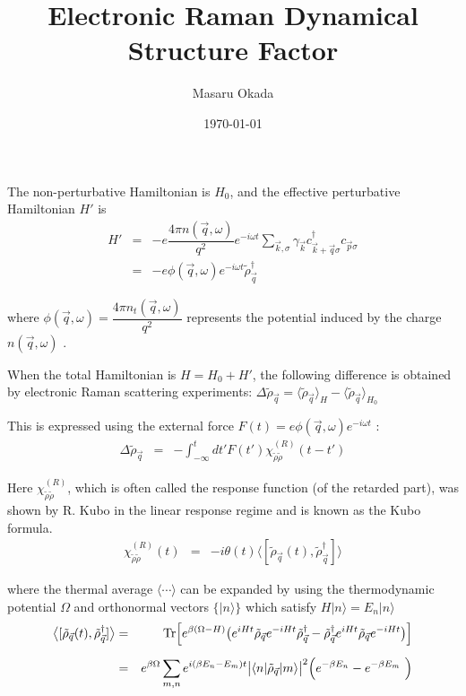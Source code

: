 \documentclass[uplatex,a4j,12pt,dvipdfmx]{jsarticle}
\title{
Electronic Raman Dynamical Structure Factor
}
\author{Masaru Okada}
\date{\today}
\begin{document}
\maketitle

\thispagestyle{empty}
The non-perturbative Hamiltonian is $H_{0}$,
and the effective perturbative Hamiltonian $H'$ is
\begin{eqnarray}
	H'
	&=&
	-e \dfrac{ 4 \pi n ( \vec{q} , \omega ) }{ q^{2} }
	e^{- i \omega t}
	\sum_{\vec{k},\sigma}
	\gamma_{\vec{k}}
	c^{\dagger}_{\vec{k}+\vec{q} \sigma} c_{\vec{p} \sigma}
	\nonumber \\ &=&
	- e \phi(\vec{q},\omega) e^{- i \omega t} \tilde{\rho}^{\dagger}_{\vec{q}}
\end{eqnarray}

where
$\phi(\vec{q},\omega) = \dfrac{ 4 \pi n_{t} ( \vec{q} , \omega ) }{ q^{2} }$
represents the potential induced by the charge
$n ( \vec{q} , \omega )$
.

When the total Hamiltonian is $H=H_{0}+H'$,
the following difference is obtained by electronic Raman scattering experiments:
$\Delta \tilde{\rho}_{\vec{q}} = \langle \tilde{\rho}_{\vec{q}} \rangle_{H} - \langle \tilde{\rho}_{\vec{q}} \rangle_{H_{0}}$


This is expressed using the external force
$F(t) = e \phi(\vec{q},\omega) e^{- i \omega t}$
:
\begin{eqnarray}
	\Delta \tilde{\rho}_{\vec{q}}
	&=&
	- \int^{t}_{-\infty} dt' F(t') \chi^{(R)}_{\tilde{\rho} \tilde{\rho}}(t - t')
\end{eqnarray}


Here
$\chi^{(R)}_{\tilde{\rho} \tilde{\rho}}$,
which is often called the response function (of the retarded part),
was shown by R. Kubo in the linear response regime and is known as the Kubo formula.
\begin{eqnarray}
	\chi^{(R)}_{\tilde{\rho} \tilde{\rho}}(t)
	&=&
	- i \theta(t) \big\langle [ \tilde{\rho}_{\vec{q}}(t) , \tilde{\rho}_{\vec{q}}^{\dagger} ] \big\rangle
\end{eqnarray}


where the thermal average $\langle \cdots \rangle$ can be expanded
by using the thermodynamic potential $\Omega$
and orthonormal vectors $\big\{ | n \rangle \big\}$ which satisfy
$H | n \rangle = E_{n} | n \rangle$
\begin{eqnarray}
	\big\langle [ \tilde{\rho}_{\vec{q}}(t) , \tilde{\rho}_{\vec{q}}^{\dagger} ] \big\rangle
	&=&
	{\rm Tr}
	\Big[ e^{\beta ( \Omega - H ) }
		\big(
		e^{i H t} \tilde{\rho}_{\vec{q}} e^{-iHt} \tilde{\rho}_{\vec{q}}^{\dagger}
		-
		\tilde{\rho}_{\vec{q}}^{\dagger} e^{i H t} \tilde{\rho}_{\vec{q}} e^{-iHt}
		\big) \Big]
	\nonumber \\[2mm] &=&
	e^{\beta \Omega}
	\sum_{m,n} e^{i ( \beta E_{n} - E_{m} ) t }
	\big| \langle n | \tilde{\rho}_{\vec{q}} | m \rangle \big|^{2} \Big( e^{- \beta E_{n}} - e^{- \beta E_{m}}  \Big)
\end{eqnarray}
\end{document}
